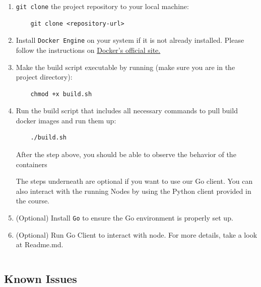 \begin{enumerate}
    \item \texttt{git clone} the project repository to your local machine:
    \begin{verbatim}
    git clone <repository-url>
    \end{verbatim}

    \item Install \texttt{Docker Engine} on your system if it is not already installed. Please follow the instructions on \href{https://docs.docker.com/}{Docker's official site.}

    \item Make the build script executable by running (make sure you are in the project directory):
    \begin{verbatim}
    chmod +x build.sh
    \end{verbatim}

    \item Run the build script that includes all necessary commands to pull build docker images and run them up:
    \begin{verbatim}
    ./build.sh
    \end{verbatim}

After the step above, you should be able to observe the behavior of the containers 

The steps underneath are optional if you want to use our Go client. You can also interact with the running Nodes by using the Python client provided in the course.

    \item (Optional) Install \texttt{Go} to ensure the Go environment is properly set up.

    \item (Optional) Run Go Client to interact with node. For more details, take a look at Readme.md.
    \begin{verbatim}

    \end{verbatim}
\end{enumerate}


\subsection{Known Issues}

